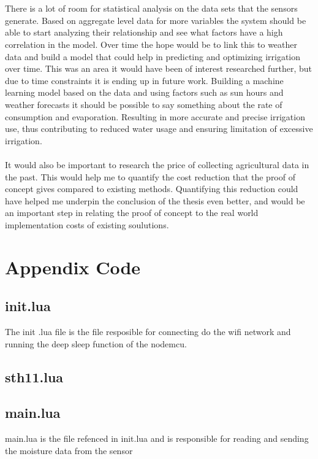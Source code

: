 \documentclass[]{uiophd}
\begin{document}
\\\\
There is a lot of room for statistical analysis on the data sets that the sensors generate. Based on aggregate level data for more variables the system should be able to start analyzing their relationship and see what factors have a high correlation in the model. Over time the hope would be to link this to weather data and build a model that could help in predicting and optimizing irrigation over time. This was an area it would have been of interest researched further, but due to time constraints it is ending up in future work. Building a machine learning model based on the data and using factors such as sun hours and weather forecasts it should be possible to say something about the rate of consumption and evaporation. Resulting in more accurate and precise irrigation use, thus contributing to reduced water usage and ensuring limitation of excessive irrigation.
\\\\
It would also be important to research the price of collecting agricultural data in the past. This would help me to quantify the cost reduction that the proof of concept gives compared to existing methods. Quantifying this reduction could have helped me underpin the conclusion of the thesis even better, and would be an important step in relating the proof of concept to the real world implementation costs of existing soulutions.

\printbibliography

\chapter{Appendix Code}
\linespread{1}

\section{init.lua}
The init .lua file is the file resposible for connecting do the wifi network and running the deep sleep function of the nodemcu.


\section{sth11.lua}


\section{main.lua}
main.lua is the file refenced in init.lua and is responsible for reading and sending the moisture data from the sensor

\end{document}
